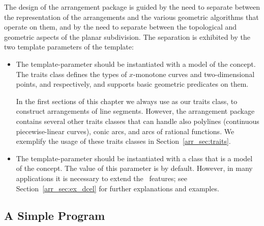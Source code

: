 The design of the arrangement package is guided by the need to
separate between the representation of the arrangements and the
various geometric algorithms that operate on them, and by the need to
separate between the topological and geometric aspects of the planar
subdivision. The separation is exhibited by the two template
parameters of the  template:
\begin{itemize}
\item The  template-parameter should be instantiated with
a model of the  concept. The traits
class defines the types of $x$-monotone curves and two-dimensional
points,  and  respectively, and
supports basic geometric predicates on them.

In the first sections of this chapter we always use
 as our traits class, to construct
arrangements of line segments. However, the arrangement package 
contains several other traits classes that can handle also
polylines (continuous piecewise-linear curves), conic arcs, and arcs
of rational functions. We exemplify the usage of these traits classes
in Section~\ref{arr_sec:traits}.
\item The  template-parameter should be instantiated with
a class that is a model of the  concept. The
value of this parameter is  by default.
However, in many applications it is necessary
to extend the \dcel\ features; see Section~\ref{arr_sec:ex_dcel} for
further explanations and examples.
\end{itemize}

\subsection{A Simple Program}

